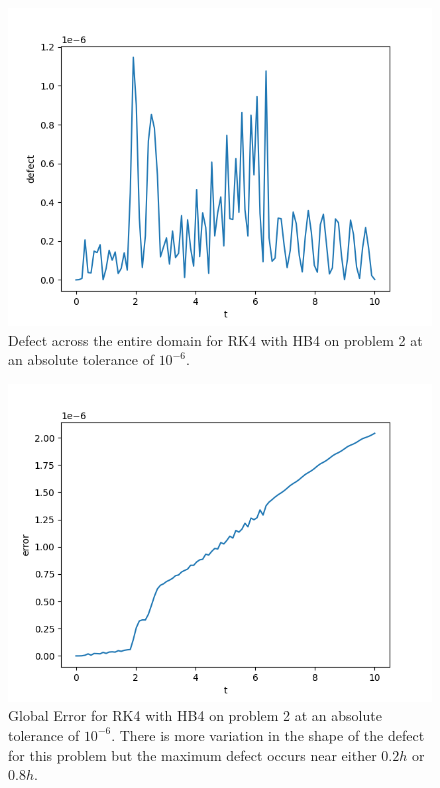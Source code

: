 \begin{figure}[H]
\centering
\includegraphics[width=0.7\linewidth]{./figures/rk4_with_hb4_p2_global_defect}
\caption{Defect across the entire domain for RK4 with HB4 on problem 2 at an absolute tolerance of $10^{-6}$.}
\label{fig:rk4_with_hb4_p2_global_defect}
\end{figure}

\begin{figure}[H]
\centering
\includegraphics[width=0.7\linewidth]{./figures/rk4_with_hb4_p2_global_error}
\caption{Global Error for RK4 with HB4 on problem 2 at an absolute tolerance of $10^{-6}$. There is more variation in the shape of the defect for this problem but the maximum defect occurs near either $0.2h$ or $0.8h$.}
\label{fig:rk4_with_hb4_p2_global_error}
\end{figure}

